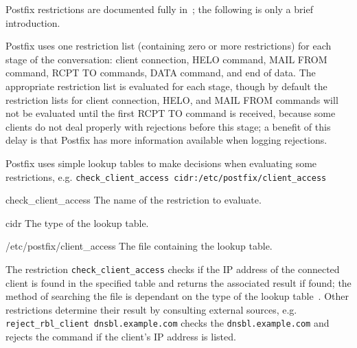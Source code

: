 \label{Mixing and matching Postfix restrictions}

Postfix restrictions are documented fully in~\cite{smtpd_per_user_control,
policy-servers, smtpd_access_readme}; the following is only a brief
introduction.

Postfix uses one restriction list (containing zero or more restrictions)
for each stage of the  conversation: client connection, HELO
command, MAIL FROM command, RCPT TO commands, DATA command, and end of
data.  The appropriate restriction list is evaluated for each stage, though
by default the restriction lists for client connection, HELO, and MAIL FROM
commands will not be evaluated until the first RCPT TO command is received,
because some clients do not deal properly with rejections before this
stage; a benefit of this delay is that Postfix has more information
available when logging rejections.

Postfix uses simple lookup tables to make decisions when evaluating some
restrictions, e.g.\newline{}
\tab{}\texttt{check\_client\_access~cidr:/etc/postfix/client\_access}

\begin{boldeqlist}

    \item [check\_client\_access] The name of the restriction to evaluate.

    \item [cidr] The type of the lookup table.

    \item [/etc/postfix/client\_access] The file containing the lookup
        table.

\end{boldeqlist}

The restriction \texttt{check\_client\_access} checks if the IP address of
the connected client is found in the specified table and returns the
associated result if found; the method of searching the file is dependant
on the type of the lookup table~\cite{postfix-lookup-tables}.  Other
restrictions determine their result by consulting external sources,
e.g.\newline{} \tab{}\texttt{reject\_rbl\_client
dnsbl.example.com}\newline{} checks the 
\texttt{dnsbl.example.com} and rejects the command if the client's IP
address is listed.

